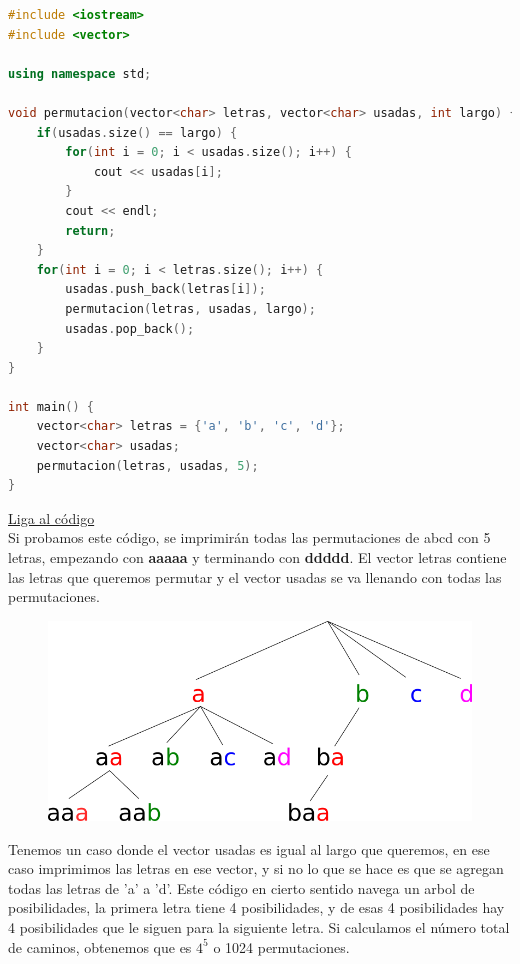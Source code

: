 \documentclass{article}
\begin{document}
\begin{lstlisting}[language=C++, caption=Permutaciones]
#include <iostream>
#include <vector>

using namespace std;

void permutacion(vector<char> letras, vector<char> usadas, int largo) {
    if(usadas.size() == largo) {
        for(int i = 0; i < usadas.size(); i++) {
            cout << usadas[i];
        }
        cout << endl;
        return;
    }
    for(int i = 0; i < letras.size(); i++) {
        usadas.push_back(letras[i]);
        permutacion(letras, usadas, largo);
        usadas.pop_back();
    }
}

int main() {
    vector<char> letras = {'a', 'b', 'c', 'd'};
    vector<char> usadas;
    permutacion(letras, usadas, 5);
}
\end{lstlisting}
\href{https://repl.it/@Jamesscn/Permutando}{Liga al código} \\

Si probamos este código, se imprimirán todas las permutaciones de abcd con 5 letras, empezando con \textbf{aaaaa} y terminando con \textbf{ddddd}. El vector letras contiene las letras que queremos permutar y el vector usadas se va llenando con todas las permutaciones.

\begin{figure}[H]
    \centering
    \includegraphics[width=0.3\paperwidth]{permutacion}
\end{figure}

Tenemos un caso donde el vector usadas es igual al largo que queremos, en ese caso imprimimos las letras en ese vector, y si no lo que se hace es que se agregan todas las letras de 'a' a 'd'. Este código en cierto sentido navega un arbol de posibilidades, la primera letra tiene 4 posibilidades, y de esas 4 posibilidades hay 4 posibilidades que le siguen para la siguiente letra. Si calculamos el número total de caminos, obtenemos que es $4^5$ o 1024 permutaciones.
\end{document}
